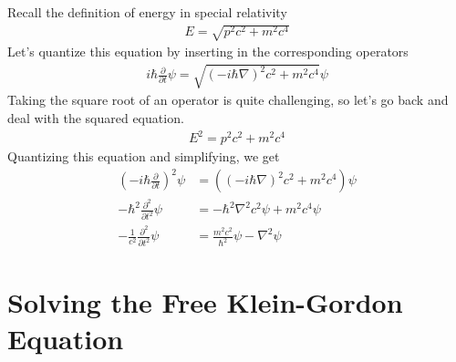 \documentclass[book.tex]{subfiles}
\begin{document}
Recall the definition of energy in special relativity
\begin{align}
    E = \sqrt{p^2c^2 + m^2c^4} 
\end{align}
Let's quantize this equation by inserting in the corresponding operators
\begin{align}
    i\hbar\frac{\partial}{\partial t} \psi = \sqrt{(-i\hbar \nabla)^2c^2 + m^2c^4} \psi 
\end{align}
Taking the square root of an operator is quite challenging, so let's go back and deal with the squared equation.
\begin{align}
    E^2 = p^2c^2 + m^2c^4
\end{align}
Quantizing this equation and simplifying, we get
\begin{align}
    (-i\hbar \frac{\partial}{\partial t})^2 \psi &= ((-i\hbar \nabla)^2 c^2 + m^2 c^4) \psi \\
    -\hbar^2 \frac{\partial^2}{\partial t^2} \psi &= - \hbar^2 \nabla^2 c^2\psi + m^2c^4 \psi \\
    -\frac{1}{c^2} \frac{\partial^2}{\partial t^2} \psi &= \frac{m^2c^2}{\hbar^2} \psi - \nabla^2 \psi
\end{align}

\section{Solving the Free Klein-Gordon Equation}
\end{document}
